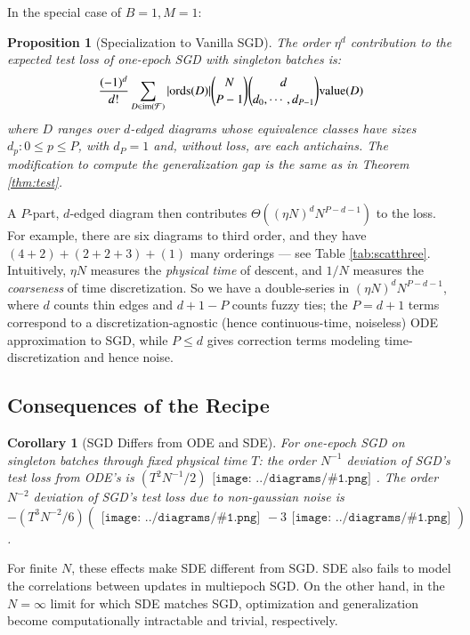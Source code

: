 \documentclass{article}
\newtheorem{cor}{Corollary}
\newtheorem{prop}{Proposition}
\newcommand{\Free}{\mathcal{F}}
\newcommand{\image}{\text{\textnormal{im}}}
\newcommand{\dvalue}{\text{\textnormal{value}}}
\newcommand{\ords}{\text{\textnormal{ords}}}
\newcommand{\sdia}[1]{\begin{gathered}\texttt{[image: ../diagrams/\#1.png]}\end{gathered}}
\begin{document}
        In the special case of $B=1, M=1$:
        \begin{prop}[Specialization to Vanilla SGD] \label{prop:vanilla}
            The order $\eta^d$ contribution to the expected test loss of
            one-epoch SGD with singleton batches is:
            \begin{equation}\label{eq:sgdbasiccoef}
                \frac{(-1)^d}{d!} \sum_{D\in \image(\Free)} 
                |\ords(D)| {N \choose P-1} {d \choose d_0,\cdots,d_{P-1}}
                \dvalue(D)
            \end{equation}
            where $D$ ranges over $d$-edged diagrams whose equivalence classes
            have sizes $d_p: 0\leq p\leq P$, with $d_P=1$
            and, without loss, are each antichains.  The modification to
            compute the generalization gap is the same as in Theorem
            \ref{thm:test}.
        \end{prop}
        A $P$-part, $d$-edged diagram then contributes $\Theta\left((\eta N)^d
        N^{P-d-1}\right)$ to the loss.  For example, there are six diagrams to
        third order, and they have $(4+2)+(2+2+3)+(1)$ many orderings --- see
        Table \ref{tab:scatthree}.  Intuitively, $\eta N$ measures the \emph{
        physical time} of descent, and $1/N$ measures the \emph{coarseness} of
    time discretization.  So we have a double-series in $(\eta N)^d N^{P-d-1}$,
    where $d$ counts thin edges and $d+1-P$ counts fuzzy ties; the $P=d+1$
    terms correspond to a discretization-agnostic (hence continuous-time,
    noiseless) ODE approximation to SGD, while $P\leq d$ gives correction terms
    modeling time-discretization and hence noise.  


    \subsection{Consequences of the Recipe}

        \begin{cor}[SGD Differs from ODE and SDE] \label{cor:vsode}
            For one-epoch SGD on singleton batches through fixed physical time
            $T$: the order $N^{-1}$ deviation of SGD's test loss from ODE's is
            $
                ({{T^2 N^{-1}}/{2}}) \sdia{c(01-2)(02-12)}
            $.
            The order $N^{-2}$ deviation of SGD's test loss due to non-gaussian
            noise is
            $
                -({{T^3 N^{-2}}/{6}}) (\sdia{c(012-3)(03-13-23)} - 3 \sdia{c(01-2-3)(03-13-23)})
            $.
        \end{cor}
        For finite $N$, these effects make SDE different from SGD.  SDE also
        fails to model the correlations between updates in multiepoch SGD.  On
        the other hand, in the $N=\infty$ limit for which SDE matches SGD,
        optimization and generalization become computationally intractable and
        trivial, respectively. 
    
\end{document}
